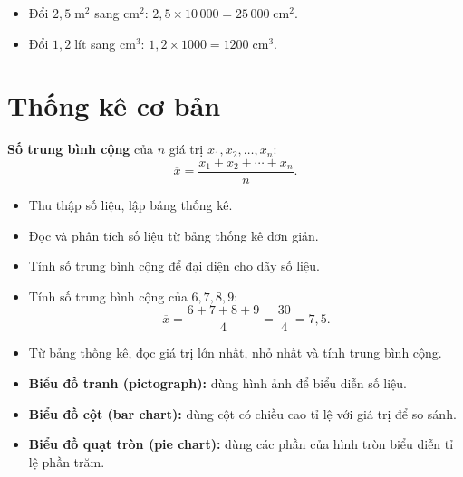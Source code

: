 \documentclass[12pt,a4paper]{article}
\begin{document}
\begin{vidu}
\begin{itemize}
  \item Đổi $2{,}5\;\text{m}^2$ sang $\text{cm}^2$: $2{,}5 \times 10\,000 = 25\,000\;\text{cm}^2$.
  \item Đổi $1{,}2\;\text{lít}$ sang $\text{cm}^3$: $1{,}2 \times 1000 = 1200\;\text{cm}^3$.
\end{itemize}
\end{vidu}

\section{Thống kê cơ bản}

\begin{dinhnghia}
\textbf{Số trung bình cộng} của $n$ giá trị $x_1, x_2, \ldots, x_n$:
\[
\overline{x} = \frac{x_1 + x_2 + \cdots + x_n}{n}.
\]
\end{dinhnghia}

\begin{phuongphap}
\begin{itemize}
  \item Thu thập số liệu, lập bảng thống kê.
  \item Đọc và phân tích số liệu từ bảng thống kê đơn giản.
  \item Tính số trung bình cộng để đại diện cho dãy số liệu.
\end{itemize}
\end{phuongphap}

\begin{vidu}
\begin{itemize}
  \item Tính số trung bình cộng của $6, 7, 8, 9$:
    \[\overline{x} = \frac{6 + 7 + 8 + 9}{4} = \frac{30}{4} = 7{,}5.\]
  \item Từ bảng thống kê, đọc giá trị lớn nhất, nhỏ nhất và tính trung bình cộng.
\end{itemize}
\end{vidu}

\begin{phuongphap}[title={Biểu đồ thống kê}]
\begin{itemize}
  \item \textbf{Biểu đồ tranh (pictograph):} dùng hình ảnh để biểu diễn số liệu.
  \item \textbf{Biểu đồ cột (bar chart):} dùng cột có chiều cao tỉ lệ với giá trị để so sánh.
  \item \textbf{Biểu đồ quạt tròn (pie chart):} dùng các phần của hình tròn biểu diễn tỉ lệ phần trăm.
\end{itemize}
\end{phuongphap}
\end{document}
